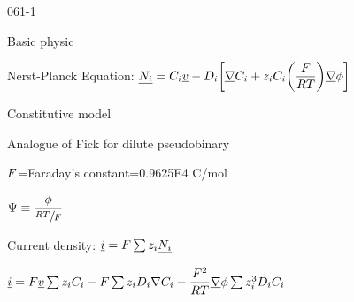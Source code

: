 \begin{mitframe}{061-1}
\begin{listone}
\item Basic physic
		\begin{listtwo}
			\item Nerst-Planck Equation: $\uline{\massspecflux{i}}=\conc_{\state}\uline{\vvel}-\pdiff\bigg[\gradop\conc_{\state}+z_{\state}\conc_{\state}\bigg(\dfrac{\force}{\gasconst\Temp}\bigg)\gradop\eleccoeff\bigg]$
          \begin{listthree}
          		\item Constitutive model
                \item Analogue of Fick for dilute pseudobinary
                \item $\force$=Faraday's constant=0.9625E4 C/mol
                \item $\streamfunc\equiv\dfrac{\eleccoeff}{\sfrac{\gasconst\Temp}{\force}}$
                          \end{listthree}  
		\item Current density: $\uline{\currentdensity}=\force\sum\nolimits{z}_{\state}\uline{\massspecflux{i}}$
        		\begin{listthree}
                	\item $\uline{\currentdensity}=\force\uline{\vvel}\sum\nolimits{z}_{\state}\conc_{\state}-\force\sum\nolimits{z}_{\state}\pdiff\nabla\conc_{\state}-\dfrac{\force^2}{\gasconst\Temp}\gradop\eleccoeff\sum\nolimits{z}_{\state}^3\pdiff\conc_{\state}$
                    

\end{listthree}
\end{listtwo}
\end{listone}
\end{mitframe}
